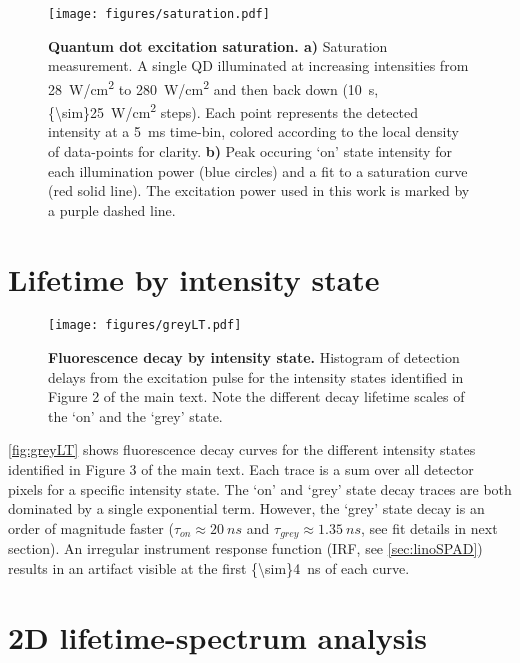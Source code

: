 \documentclass[journal=nalefd, manuscript=letter, layout=twocolumn]{achemso}
\begin{document}
\begin{figure}[h]
    \centering
    \texttt{[image: figures/saturation.pdf]}
    \caption{\textbf{Quantum dot excitation saturation. a)} Saturation measurement. A single QD illuminated at increasing intensities from \SI{28}{W/cm^2} to \SI{280}{W/cm^2} and then back down (\SI{10}{s},  \SI{{\sim}25}{W/cm^2} steps). Each point represents the detected intensity at a \SI{5}{ms} time-bin, colored according to the local density of data-points for clarity. \textbf{b)} Peak occuring `on' state intensity for each illumination power (blue circles) and a fit to a saturation curve (red solid line). The excitation power used in this work is marked by a purple dashed line.}
    \label{fig:saturation}
\end{figure}

\section{Lifetime by intensity state}\label{sec:grey}

\begin{figure}[h]
    \centering
    \texttt{[image: figures/greyLT.pdf]}
    \caption{\textbf{Fluorescence decay by intensity state.} Histogram of detection delays from the excitation pulse for the intensity states identified in Figure 2 of the main text. Note the different decay lifetime scales of the `on' and the `grey' state.}
    \label{fig:greyLT}
\end{figure}

\autoref{fig:greyLT} shows fluorescence decay curves for the different intensity states identified in Figure 3 of the main text. Each trace is a sum over all detector pixels for a specific intensity state. The `on' and `grey' state decay traces are both dominated by a single exponential term. However, the `grey' state decay is an order of magnitude faster ($\tau_{on}\approx\SI{20}{ns}$ and $\tau_{grey}\approx\SI{1.35}{ns}$, see fit details in next section). An irregular instrument response function (IRF, see \autoref{sec:linoSPAD}) results in an artifact visible at the first \SI{{\sim}4}{ns} of each curve. 

\section{2D lifetime-spectrum analysis} \label{sec:specLtFit}
\end{document}
